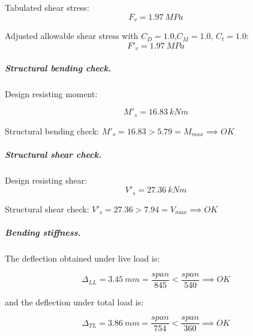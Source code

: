 \noindent Tabulated shear stress:
\begin{equation}
  F_v= 1.97\ MPa
\end{equation}

\noindent Adjusted allowable shear stress with $C_D= 1.0$,$C_M= 1.0$, $C_t= 1.0$:
\begin{equation}
  F'_v= 1.97\ MPa
\end{equation}

\subparagraph{Structural bending check.}

\noindent Design resisting moment:

\begin{equation}
  M'_s= 16.83\ kN m
\end{equation}

\noindent Structural bending check: $M'_s = 16.83 > 5.79 = M_{max} \implies OK$

\subparagraph{Structural shear check.}

\noindent Design resisting shear:
\begin{equation}
  V'_s= 27.36\ kN m
\end{equation}

\noindent Structural shear check: $V'_s = 27.36 > 7.94 = V_{max} \implies OK$

\subparagraph{Bending stiffness.}
The deflection obtained under live load is:

\begin{equation}
  \Delta_{LL}= 3.45\ mm= \frac{span}{845} < \frac{span}{540} \implies OK
\end{equation}

\noindent and the deflection under total load is:

\begin{equation}
  \Delta_{TL}= 3.86\ mm= \frac{span}{754} < \frac{span}{360} \implies OK
\end{equation}

